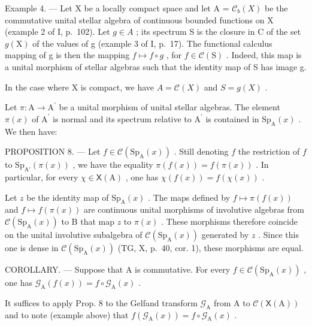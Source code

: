 Example 4. --- Let X be a locally compact space and let A = \(\mathcal{C}_{b}(X)\) be the commutative unital stellar algebra of continuous bounded functions on X (example 2 of I, p.~102). Let \(g \in A\) ; its spectrum S is the closure in C of the set \(g(\mathrm{X})\) of the values of g (example 3 of I, p.~17). The functional calculus mapping of g is then the mapping \(f \mapsto f \circ g\) , for \(f \in \mathcal{C}(\mathrm{S})\) . Indeed, this map is a unital morphism of stellar algebras such that the identity map of S has image g.

In the case where X is compact, we have \(A = \mathcal{C}(X)\) and \(S = g(X)\) .

Let \(\pi\colon\mathrm{A}\to\mathrm{A}^{\prime}\) be a unital morphism of unital stellar algebras. The element \(\pi(x)\) of \(\mathrm{A}^{\prime}\) is normal and its spectrum relative to \(\mathrm{A}^{\prime}\) is contained in \(\mathrm{Sp}_{\mathrm{A}}(x)\) . We then have:

PROPOSITION 8. --- Let \(f \in \mathcal{C}(\mathrm{Sp}_{\mathrm{A}}(x))\) . Still denoting \(f\) the restriction of \(f\) to \(\mathrm{Sp}_{\mathrm{A}'}(\pi(x))\) , we have the equality \(\pi(f(x)) = f(\pi(x))\) . In particular, for every \(\chi \in \mathsf{X}(\mathrm{A})\) , one has \(\chi(f(x)) = f(\chi(x))\) .

Let \(z\) be the identity map of \(\mathrm{Sp}_{\mathrm{A}}(x)\) . The maps defined by \(f \mapsto \pi(f(x))\) and \(f \mapsto f(\pi(x))\) are continuous unital morphisms of involutive algebras from \(\mathcal{C}(\mathrm{Sp}_{\mathrm{A}}(x))\) to B that map \(z\) to \(\pi(x)\) . These morphisms therefore coincide on the unital involutive subalgebra of \(\mathcal{C}(\mathrm{Sp}_{\mathrm{A}}(x))\) generated by \(z\) . Since this one is dense in \(\mathcal{C}(\mathrm{Sp}_{\mathrm{A}}(x))\) (TG, X, p.~40, cor. 1), these morphisms are equal.

COROLLARY. --- Suppose that A is commutative. For every \(f \in \mathcal{C}(\mathrm{Sp}_{\mathrm{A}}(x))\) , one has \(\mathcal{G}_{\mathrm{A}}(f(x)) = f \circ \mathcal{G}_{\mathrm{A}}(x)\) .

It suffices to apply Prop. 8 to the Gelfand transform \(\mathcal{G}_{\mathrm{A}}\) from A to \(\mathcal{C}(\mathsf{X}(\mathrm{A}))\) and to note (example above) that \(f(\mathcal{G}_{\mathrm{A}}(x)) = f \circ \mathcal{G}_{\mathrm{A}}(x)\) .


